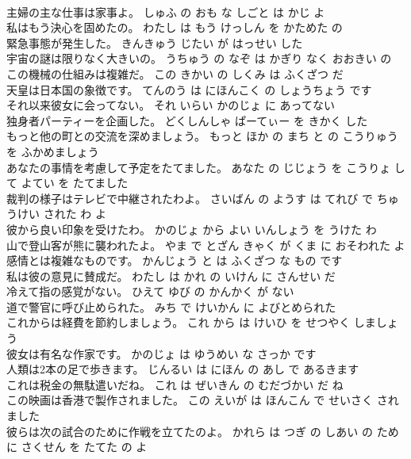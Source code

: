 \documentclass[8pt]{extreport}
\begin{document}
\begin{CJK}{UTF8}{min}
\\	主婦の主な仕事は家事よ。	しゅふ の おも な しごと は かじ よ 
\\	私はもう決心を固めたの。	わたし は もう けっしん を かためた の 
\\	緊急事態が発生した。	きんきゅう じたい が はっせい した 
\\	宇宙の謎は限りなく大きいの。	うちゅう の なぞ は かぎり なく おおきい の 
\\	この機械の仕組みは複雑だ。	この きかい の しくみ は ふくざつ だ 
\\	天皇は日本国の象徴です。	てんのう は にほんこく の しょうちょう です 
\\	それ以来彼女に会ってない。	それ いらい かのじょ に あってない 
\\	独身者パーティーを企画した。	どくしんしゃ ぱーてぃー を きかく した 
\\	もっと他の町との交流を深めましょう。	もっと ほか の まち と の こうりゅう を ふかめましょう 
\\	あなたの事情を考慮して予定をたてました。	あなた の じじょう を こうりょ して よてい を たてました 
\\	裁判の様子はテレビで中継されたわよ。	さいばん の ようす は てれび で ちゅうけい された わ よ 
\\	彼から良い印象を受けたわ。	かのじょ から よい いんしょう を うけた わ 
\\	山で登山客が熊に襲われたよ。	やま で とざん きゃく が くま に おそわれた よ 
\\	感情とは複雑なものです。	かんじょう と は ふくざつ な もの です 
\\	私は彼の意見に賛成だ。	わたし は かれ の いけん に さんせい だ 
\\	冷えて指の感覚がない。	ひえて ゆび の かんかく が ない 
\\	道で警官に呼び止められた。	みち で けいかん に よびとめられた 
\\	これからは経費を節約しましょう。	これ から は けいひ を せつやく しましょう 
\\	彼女は有名な作家です。	かのじょ は ゆうめい な さっか です 
\\	人類は2本の足で歩きます。	じんるい は にほん の あし で あるきます 
\\	これは税金の無駄遣いだね。	これ は ぜいきん の むだづかい だ ね 
\\	この映画は香港で製作されました。	この えいが は ほんこん で せいさく されました 
\\	彼らは次の試合のために作戦を立てたのよ。	かれら は つぎ の しあい の ため に さくせん を たてた の よ 

\end{CJK}
\end{document}
